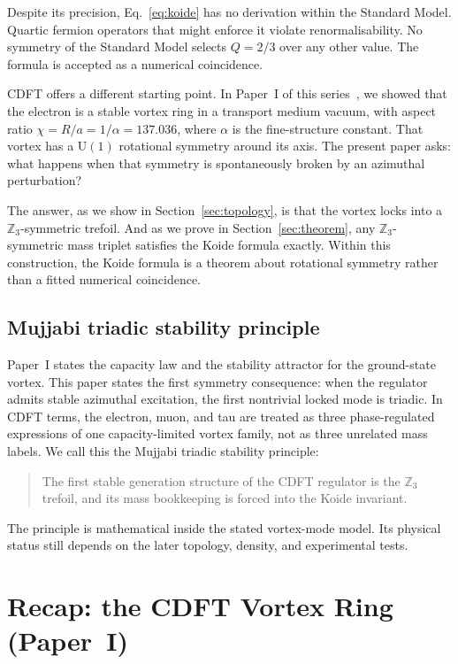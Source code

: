\documentclass[11pt]{article}
\begin{document}
Despite its precision, Eq.~\eqref{eq:koide} has no derivation within the Standard
Model. Quartic fermion operators that might enforce it violate renormalisability.
No symmetry of the Standard Model selects $Q = 2/3$ over any other value.
The formula is accepted as a numerical coincidence.

CDFT offers a different starting point. In Paper~I of this series~\cite{MujjabiI2026},
we showed that the electron is a stable vortex ring in a transport medium vacuum,
with aspect ratio $\chi = R/a = 1/\alpha = 137.036$, where $\alpha$ is the
fine-structure constant.
That vortex has a $\mathrm{U}(1)$ rotational symmetry around its axis.
The present paper asks: what happens when that symmetry is spontaneously broken by
an azimuthal perturbation?

The answer, as we show in Section~\ref{sec:topology}, is that the vortex locks into
a $\mathbb{Z}_3$-symmetric trefoil. And as we prove in Section~\ref{sec:theorem},
any $\mathbb{Z}_3$-symmetric mass triplet satisfies the Koide formula exactly.
Within this construction, the Koide formula is a theorem about rotational
symmetry rather than a fitted numerical coincidence.

\subsection{Mujjabi triadic stability principle}

Paper~I states the capacity law and the stability attractor for the ground-state
vortex. This paper states the first symmetry consequence: when the regulator
admits stable azimuthal excitation, the first nontrivial locked mode is triadic.
In CDFT terms, the electron, muon, and tau are treated as three phase-regulated
expressions of one capacity-limited vortex family, not as three unrelated mass
labels. We call this the Mujjabi triadic stability principle:
\begin{quote}
The first stable generation structure of the CDFT regulator is the
$\mathbb{Z}_3$ trefoil, and its mass bookkeeping is forced into the Koide
invariant.
\end{quote}
The principle is mathematical inside the stated vortex-mode model. Its physical
status still depends on the later topology, density, and experimental tests.


\section{Recap: the CDFT Vortex Ring (Paper~I)}
\label{sec:recap}
\end{document}
